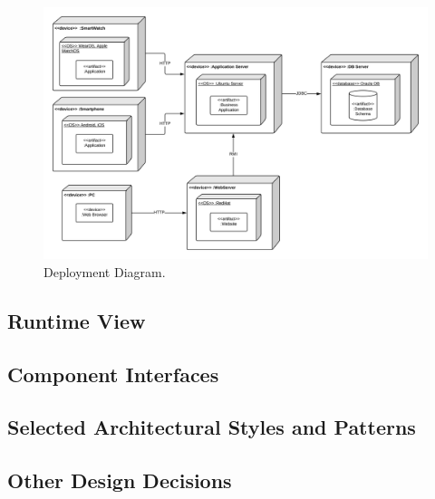 \begin{figure}[H]
\centering
\includegraphics[scale=0.35]{Images/DeploymentDiagram.png}
\caption{Deployment Diagram.}
\end{figure}

\subsection{Runtime View}
\subsection{Component Interfaces}
\subsection{Selected Architectural Styles and Patterns}
\subsection{Other Design Decisions}